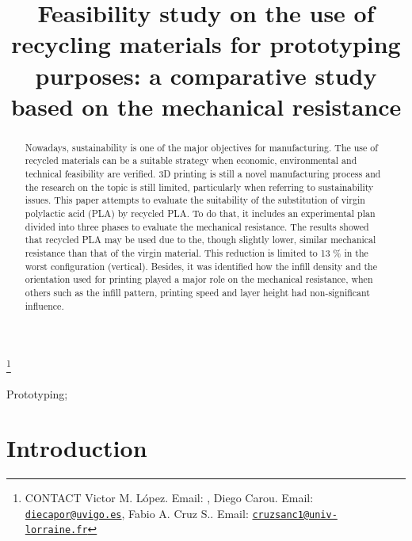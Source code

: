 \documentclass[]{interact}
\theoremstyle{plain}%
\theoremstyle{definition}
\theoremstyle{remark}
\begin{document}
\articletype{}

\title{Feasibility study on the use of recycling materials for
prototyping purposes: a comparative study based on the mechanical
resistance}


\author{
}

\thanks{CONTACT Victor M. López. Email: , Diego
Carou. Email: \href{mailto:diecapor@uvigo.es}{\nolinkurl{diecapor@uvigo.es}}, Fabio
A. Cruz
S.. Email: \href{mailto:cruzsanc1@univ-lorraine.fr}{\nolinkurl{cruzsanc1@univ-lorraine.fr}}}

\maketitle

\begin{abstract}
Nowadays, sustainability is one of the major objectives for
manufacturing. The use of recycled materials can be a suitable strategy
when economic, environmental and technical feasibility are verified. 3D
printing is still a novel manufacturing process and the research on the
topic is still limited, particularly when referring to sustainability
issues. This paper attempts to evaluate the suitability of the
substitution of virgin polylactic acid (PLA) by recycled PLA. To do
that, it includes an experimental plan divided into three phases to
evaluate the mechanical resistance. The results showed that recycled PLA
may be used due to the, though slightly lower, similar mechanical
resistance than that of the virgin material. This reduction is limited
to 13 \% in the worst configuration (vertical). Besides, it was
identified how the infill density and the orientation used for printing
played a major role on the mechanical resistance, when others such as
the infill pattern, printing speed and layer height had non-significant
influence.
\end{abstract}

\begin{keywords}
Prototyping;
\end{keywords}

\hypertarget{introduction}{%
\section{Introduction}\label{introduction}}
\end{document}
